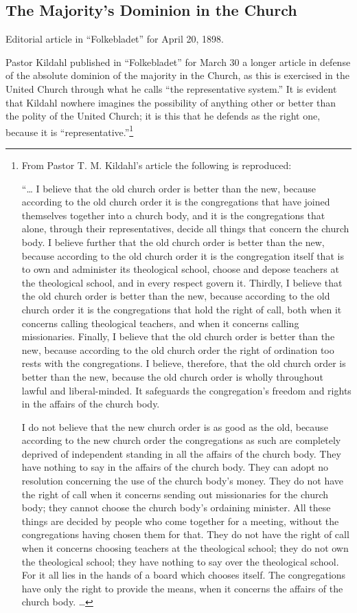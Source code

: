 
\subsection{The Majority’s Dominion in the Church}

Editorial article in “Folkebladet” for April 20, 1898.

Pastor Kildahl published in “Folkebladet” for March 30 a longer article in defense of the absolute dominion of the majority in the Church, as this is exercised in the United Church through what he calls “the representative system.” It is evident that Kildahl nowhere imagines the possibility of anything other or better than the polity of the United Church; it is this that he defends as the right one, because it is “representative.”\footnote{
From Pastor T. M. Kildahl’s article the following is reproduced:

“… I believe that the old church order is better than the new, because according to the old church order it is the congregations that have joined themselves together into a church body, and it is the congregations that alone, through their representatives, decide all things that concern the church body. I believe further that the old church order is better than the new, because according to the old church order it is the congregation itself that is to own and administer its theological school, choose and depose teachers at the theological school, and in every respect govern it. Thirdly, I believe that the old church order is better than the new, because according to the old church order it is the congregations that hold the right of call, both when it concerns calling theological teachers, and when it concerns calling missionaries. Finally, I believe that the old church order is better than the new, because according to the old church order the right of ordination too rests with the congregations. I believe, therefore, that the old church order is better than the new, because the old church order is wholly throughout lawful and liberal-minded. It safeguards the congregation’s freedom and rights in the affairs of the church body.

I do not believe that the new church order is as good as the old, because according to the new church order the congregations as such are completely deprived of independent standing in all the affairs of the church body. They have nothing to say in the affairs of the church body. They can adopt no resolution concerning the use of the church body’s money. They do not have the right of call when it concerns sending out missionaries for the church body; they cannot choose the church body’s ordaining minister. All these things are decided by people who come together for a meeting, without the congregations having chosen them for that. They do not have the right of call when it concerns choosing teachers at the theological school; they do not own the theological school; they have nothing to say over the theological school. For it all lies in the hands of a board which chooses itself. The congregations have only the right to provide the means, when it concerns the affairs of the church body. …

}
